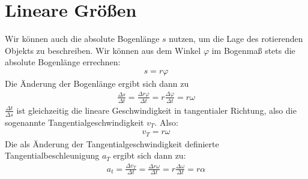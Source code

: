 \documentclass[11pt]{article}
\begin{document}
\section{Lineare Größen}
Wir können auch die absolute Bogenlänge $s$ nutzen, um die Lage des rotierenden Objekts zu beschreiben. Wir können aus dem Winkel $\varphi$ im Bogenmaß stets die absolute Bogenlänge errechnen: 
\begin{align*}
        s = r\varphi
\end{align*}
Die Änderung der Bogenlänge ergibt sich dann zu 
\begin{align*}
        \frac{\Delta s}{\Delta t} = \frac{\Delta r\varphi}{\Delta t} = r \frac{\Delta \varphi}{\Delta t} = r\omega
\end{align*}
$\frac{\Delta t}{\Delta s}$ ist gleichzeitig die lineare Geschwindigkeit in tangentialer Richtung, also die sogenannte Tangentialgeschwindigkeit $v_T$. Also: 
\begin{align*}
        v_T = r\omega
\end{align*}
Die als Änderung der Tangentialgeschwindigkeit definierte Tangentialbeschleunigung $a_T$ ergibt sich dann zu: 
\begin{align*}
        a_t = \frac{\Delta v_T}{\Delta t} = \frac{\Delta r\omega}{\Delta t} = r \frac{\Delta \omega}{\Delta t} = r\alpha
\end{align*}
\end{document}

